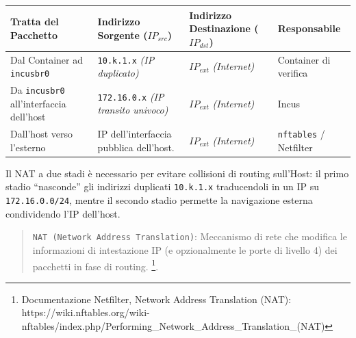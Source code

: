 \begin{longtable}[]{@{}
  >{\raggedright\arraybackslash}p{}
  >{\raggedright\arraybackslash}p{}
  >{\raggedright\arraybackslash}p{}
  >{\raggedright\arraybackslash}p{}@{}}
\toprule\noalign{}
\begin{minipage}[b]{\linewidth}\raggedright
Tratta del Pacchetto
\end{minipage} & \begin{minipage}[b]{\linewidth}\raggedright
Indirizzo Sorgente (\(IP_{src}\))
\end{minipage} & \begin{minipage}[b]{\linewidth}\raggedright
Indirizzo Destinazione (\(IP_{dst}\))
\end{minipage} & \begin{minipage}[b]{\linewidth}\raggedright
Responsabile
\end{minipage} \\
\midrule\noalign{}
\endhead
\bottomrule\noalign{}
\endlastfoot
Dal Container ad \passthrough{\lstinline!incusbr0!} &
\passthrough{\lstinline!10.k.1.x!} \emph{(IP duplicato)} & \(IP_{ext}\)
\emph{(Internet)} & Container di verifica \\
Da \passthrough{\lstinline!incusbr0!} all'interfaccia dell'host &
\passthrough{\lstinline!172.16.0.x!} \emph{(IP transito univoco)} &
\(IP_{ext}\) \emph{(Internet)} & Incus \\
Dall'host verso l'esterno & IP dell'interfaccia pubblica dell'host. &
\(IP_{ext}\) \emph{(Internet)} & \passthrough{\lstinline!nftables!} /
Netfilter \\
\end{longtable}

Il NAT a due stadi è necessario per evitare collisioni di routing
sull'Host: il primo stadio ``nasconde'' gli indirizzi duplicati
\passthrough{\lstinline!10.k.1.x!} traducendoli in un IP su
\passthrough{\lstinline!172.16.0.0/24!}, mentre il secondo stadio
permette la navigazione esterna condividendo l'IP dell'host.

\begin{quote}
\passthrough{\lstinline!NAT (Network Address Translation)!}: Meccanismo
di rete che modifica le informazioni di intestazione IP (e opzionalmente
le porte di livello 4) dei pacchetti in fase di routing. \footnote{\label{fn:ref_20}Documentazione
  Netfilter, Network Address Translation (NAT):
  https://wiki.nftables.org/wiki-nftables/index.php/Performing\_Network\_Address\_Translation\_(NAT)}.
\end{quote}

